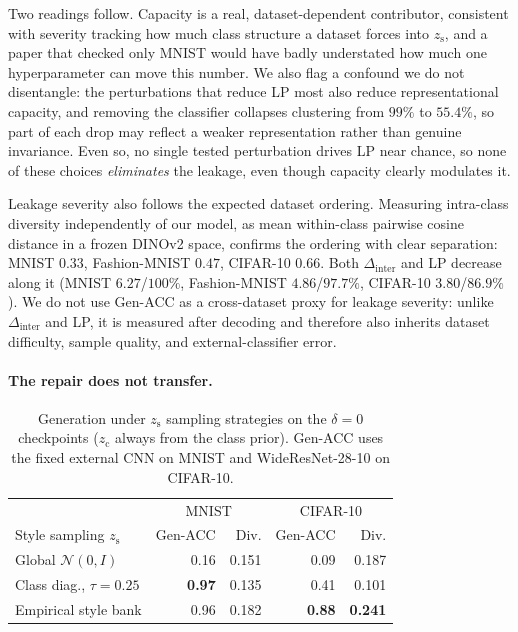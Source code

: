 \documentclass[letterpaper]{article} %
\newcommand{\zc}{z_{\mathrm{c}}}
\newcommand{\zs}{z_{\mathrm{s}}}
\newcommand{\Dinter}{\Delta_{\mathrm{inter}}}
\begin{document}
Two readings follow. Capacity is a real, dataset-dependent contributor,
consistent with severity tracking how much class structure a dataset forces
into $\zs$, and a paper that checked only MNIST would have badly understated
how much one hyperparameter can move this number. We also flag a confound we
do not disentangle: the perturbations that reduce LP most also reduce
representational capacity, and removing the classifier collapses clustering
from $99\%$ to $55.4\%$, so part of each drop may reflect a weaker
representation rather than genuine invariance. Even so, no single tested
perturbation drives LP near chance, so none of these choices \emph{eliminates}
the leakage, even though capacity clearly modulates it.

Leakage severity also follows the expected dataset ordering. {Measuring
intra-class diversity independently of our model, as mean within-class
pairwise cosine distance in a frozen DINOv2 space, confirms the ordering with
clear separation: MNIST $0.33$, Fashion-MNIST $0.47$, CIFAR-10 $0.66$.} Both
$\Dinter$ and LP decrease along it (MNIST $6.27$/$100\%$, Fashion-MNIST
$4.86$/$97.7\%$, CIFAR-10 $3.80$/$86.9\%$). We do not use Gen-ACC as a
cross-dataset proxy for leakage severity: unlike $\Dinter$ and LP, it is
measured after decoding and therefore also inherits dataset difficulty,
sample quality, and external-classifier error.

\paragraph{The repair does not transfer.}

\begin{table}[t]
\centering
\scriptsize
\setlength{\tabcolsep}{2.5pt}
\caption{Generation under $\zs$ sampling strategies on the $\delta{=}0$
checkpoints ($\zc$ always from the class prior). Gen-ACC uses the fixed
external CNN on MNIST and WideResNet-28-10 on CIFAR-10.}
\label{tab:sampling}
\begin{tabular}{lrrrr}
\toprule
& \multicolumn{2}{c}{MNIST} & \multicolumn{2}{c}{CIFAR-10} \\
Style sampling $\zs$ & Gen-ACC & Div. & Gen-ACC & Div. \\
\midrule
Global $\mathcal N(0,I)$ & 0.16 & 0.151 &
 0.09 & 0.187 \\
Class diag., $\tau{=}0.25$ & \textbf{0.97} & 0.135 & 0.41 & 0.101 \\
Empirical style bank & 0.96 & 0.182 &
\textbf{0.88} & \textbf{0.241} \\
\bottomrule
\end{tabular}
\end{table}
\end{document}
